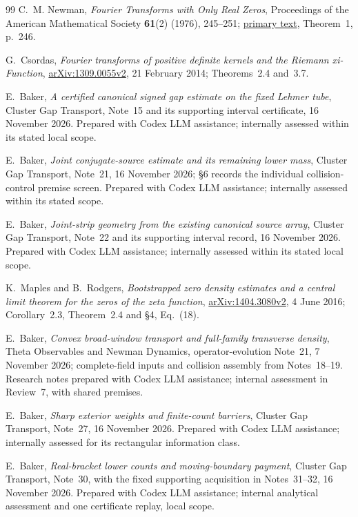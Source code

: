 \documentclass[11pt]{article}
\numberwithin{equation}{section}
\begin{document}
\begin{thebibliography}{99}
C.~M. Newman, \emph{Fourier Transforms with Only Real Zeros},
Proceedings of the American Mathematical Society \textbf{61}(2) (1976), 245--251;
\href{https://sites.math.northwestern.edu/~auffing/papers/Newman.pdf}{primary text},
Theorem~1, p.~246.

G.~Csordas, \emph{Fourier transforms of positive definite kernels and
the Riemann xi-Function},
\href{https://arxiv.org/abs/1309.0055v2}{arXiv:1309.0055v2},
21 February 2014; Theorems~2.4 and~3.7.

E.~Baker, \emph{A certified canonical signed gap estimate on the fixed
Lehmer tube}, Cluster Gap Transport, Note~15 and its supporting
interval certificate, 16 November 2026. Prepared with Codex LLM
assistance; internally assessed within its stated local scope.

E.~Baker, \emph{Joint conjugate-source estimate and its remaining lower
mass}, Cluster Gap Transport, Note~21, 16 November 2026; \S6 records
the individual collision-control premise screen. Prepared with Codex
LLM assistance; internally assessed within its stated scope.

E.~Baker, \emph{Joint-strip geometry from the existing canonical
source array}, Cluster Gap Transport, Note~22 and its supporting
interval record, 16 November 2026. Prepared with Codex LLM assistance;
internally assessed within its stated local scope.

K.~Maples and B.~Rodgers, \emph{Bootstrapped zero density estimates and
a central limit theorem for the zeros of the zeta function},
\href{https://arxiv.org/abs/1404.3080v2}{arXiv:1404.3080v2},
4 June 2016; Corollary~2.3, Theorem~2.4 and \S4, Eq.~(18).

E.~Baker, \emph{Convex broad-window transport and full-family transverse
density}, Theta Observables and Newman Dynamics, operator-evolution
Note~21, 7 November 2026; complete-field inputs and collision assembly
from Notes~18--19. Research notes prepared with Codex LLM assistance;
internal assessment in Review~7, with shared premises.

E.~Baker, \emph{Sharp exterior weights and finite-count barriers},
Cluster Gap Transport, Note~27, 16 November 2026. Prepared with Codex
LLM assistance; internally assessed for its rectangular information class.

E.~Baker, \emph{Real-bracket lower counts and moving-boundary payment},
Cluster Gap Transport, Note~30, with the fixed supporting acquisition
in Notes~31--32, 16 November 2026. Prepared with Codex LLM assistance;
internal analytical assessment and one certificate replay, local scope.


\end{thebibliography}
\end{document}
